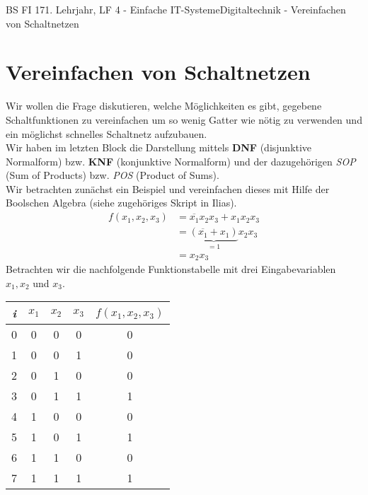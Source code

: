 \documentclass[11pt,twocolumn,oneside,openany,headings=optiontotoc,11pt,numbers=noenddot]{article}
\begin{document}
	\begin{worksheet}{BS FI 17}{1. Lehrjahr, LF 4 - Einfache IT-Systeme}{Digitaltechnik - Vereinfachen von Schaltnetzen}
		\section{Vereinfachen von Schaltnetzen}
		Wir wollen die Frage diskutieren, welche Möglichkeiten es gibt, gegebene Schaltfunktionen zu vereinfachen um so wenig Gatter wie nötig zu verwenden und ein möglichst schnelles Schaltnetz aufzubauen.\\
		Wir haben im letzten Block die Darstellung mittels \textbf{DNF} (disjunktive Normalform) bzw. \textbf{KNF} (konjunktive Normalform) und der dazugehörigen \textit{SOP} (Sum of Products) bzw. \textit{POS} (Product of Sums).\\
		Wir betrachten zunächst ein Beispiel und vereinfachen dieses mit Hilfe der Boolschen Algebra (siehe zugehöriges Skript in Ilias).
		\begin{align*}
			f(x_1,x_2,x_3) &= \overline{x_1}x_2x_3 + x_1x_2x_3\\
			&= \underbrace{(\overline{x_1} + x_1)}_{=1}x_2x_3\\
			&= x_2x_3
		\end{align*}
		Betrachten wir die nachfolgende Funktionstabelle mit drei Eingabevariablen \(x_1, x_2\) und \(x_3\).
		\begin{center}
			\begin{tabular}{|c|ccc|c|}
				\hline
				\textit{i} & \(x_1\) & \(x_2\) & \(x_3\) & \(f(x_1,x_2,x_3)\)\\
				\hline
				0 & 0 & 0 & 0 & 0\\
				\hline
				1 & 0 & 0 & 1 & 0\\
				\hline
				2 & 0 & 1 & 0 & 0\\
				\hline
				3 & 0 & 1 & 1 & 1\\
				\hline
				4 & 1 & 0 & 0 & 0\\
				\hline
				5 & 1 & 0 & 1 & 1\\
				\hline
				6 & 1 & 1 & 0 & 0\\
				\hline
				7 & 1 & 1 & 1 & 1\\
				\hline
			\end{tabular}
		\end{center}

\end{worksheet}
\end{document}
